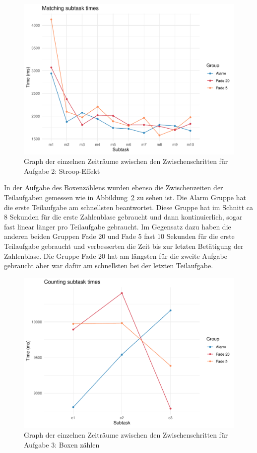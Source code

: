 \begin{figure}[H]
	\centering
	\includegraphics[width=\textwidth]{./_StudyResults/timeTask2}
	\caption{Graph der einzelnen Zeiträume zwischen den Zwischenschritten für Aufgabe 2: Stroop-Effekt}
	\label{fig:timeTask2}
\end{figure}

In der Aufgabe des Boxenzählens wurden ebenso die Zwischenzeiten der Teilaufgaben gemessen wie in Abbildung~\ref{fig:timeTask3} zu sehen ist. Die Alarm Gruppe hat die erste Teilaufgabe am schnellsten beantwortet. Diese Gruppe hat im Schnitt ca 8 Sekunden für die erste Zahlenblase gebraucht und dann kontinuierlich, sogar fast linear länger pro Teilaufgabe gebraucht. Im Gegensatz dazu haben die anderen beiden Gruppen Fade 20 und Fade 5 fast 10 Sekunden für die erste Teilaufgabe gebraucht und verbesserten die Zeit bis zur letzten Betätigung der Zahlenblase. Die Gruppe Fade 20 hat am längsten für die zweite Aufgabe gebraucht aber war dafür am schnellsten bei der letzten Teilaufgabe.

\begin{figure}[H]
	\centering
	\includegraphics[width=\textwidth]{./_StudyResults/timeTask3}
	\caption{Graph der einzelnen Zeiträume zwischen den Zwischenschritten für Aufgabe 3: Boxen zählen}
	\label{fig:timeTask3}
\end{figure}


